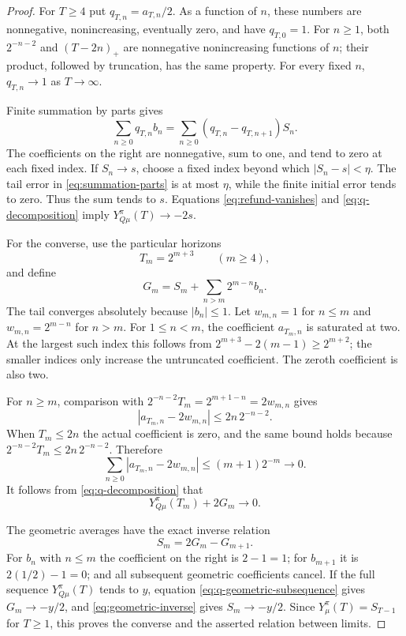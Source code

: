\documentclass[11pt]{article}
\theoremstyle{definition}
\theoremstyle{remark}
\begin{document}
\begin{proof}
For $T\ge4$ put $q_{T,n}=a_{T,n}/2$.  As a function of $n$, these
numbers are nonnegative, nonincreasing, eventually zero, and have
$q_{T,0}=1$.  For $n\ge1$, both $2^{-n-2}$ and $(T-2n)_+$ are
nonnegative nonincreasing functions of $n$; their product, followed by
truncation, has the same property.  For every fixed $n$,
$q_{T,n}\to1$ as $T\to\infty$.

Finite summation by parts gives
\begin{equation}
  \sum_{n\ge0}q_{T,n}b_n
   =\sum_{n\ge0}(q_{T,n}-q_{T,n+1})S_n.
  \label{eq:summation-parts}
\end{equation}
The coefficients on the right are nonnegative, sum to one, and tend
to zero at each fixed index.  If $S_n\to s$, choose a fixed index
beyond which $|S_n-s|<\eta$.  The tail error in
\eqref{eq:summation-parts} is at most $\eta$, while the finite initial
error tends to zero.  Thus the sum tends to $s$.  Equations
\eqref{eq:refund-vanishes} and \eqref{eq:q-decomposition} imply
$Y_{Q\mu}^{\pi}(T)\to-2s$.

For the converse, use the particular horizons
\[
  T_m=2^{m+3}\qquad(m\ge4),
\]
and define
\begin{equation}
  G_m=S_m+\sum_{n>m}2^{m-n}b_n.
  \label{eq:geometric-average}
\end{equation}
The tail converges absolutely because $|b_n|\le1$.  Let
$w_{m,n}=1$ for $n\le m$ and $w_{m,n}=2^{m-n}$ for $n>m$.
For $1\le n<m$, the coefficient $a_{T_m,n}$ is saturated at two.
At the largest such index this follows from
$2^{m+3}-2(m-1)\ge2^{m+2}$; the smaller indices only increase the
untruncated coefficient.  The zeroth coefficient is also two.

For $n\ge m$, comparison with
$2^{-n-2}T_m=2^{m+1-n}=2w_{m,n}$ gives
\[
  |a_{T_m,n}-2w_{m,n}|\le 2n\,2^{-n-2}.
\]
When $T_m\le2n$ the actual coefficient is zero, and the same bound
holds because $2^{-n-2}T_m\le2n\,2^{-n-2}$.  Therefore
\begin{equation}
  \sum_{n\ge0}|a_{T_m,n}-2w_{m,n}|
      \le(m+1)2^{-m}\longrightarrow0.
  \label{eq:coefficient-error}
\end{equation}
It follows from \eqref{eq:q-decomposition} that
\begin{equation}
  Y_{Q\mu}^{\pi}(T_m)+2G_m\longrightarrow0.
  \label{eq:q-geometric-subsequence}
\end{equation}

The geometric averages have the exact inverse relation
\begin{equation}
  S_m=2G_m-G_{m+1}.
  \label{eq:geometric-inverse}
\end{equation}
For $b_n$ with $n\le m$ the coefficient on the right is $2-1=1$;
for $b_{m+1}$ it is $2(1/2)-1=0$; and all subsequent geometric
coefficients cancel.  If the full sequence
$Y_{Q\mu}^{\pi}(T)$ tends to $y$, equation
\eqref{eq:q-geometric-subsequence} gives $G_m\to-y/2$, and
\eqref{eq:geometric-inverse} gives $S_m\to-y/2$.  Since
$Y_\mu^\pi(T)=S_{T-1}$ for $T\ge1$, this proves the converse and
the asserted relation between limits.
\end{proof}
\end{document}
